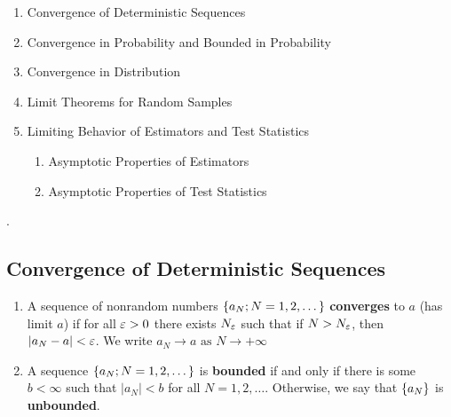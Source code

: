 \documentclass[11pt, oneside, a4paper, article]{article}
\numberwithin{equation}{section}
\begin{document}
\begin{enumerate}[noitemsep, label*=3.\arabic*.]
\item  Convergence of Deterministic Sequences
\item  Convergence in Probability and Bounded in Probability
\item  Convergence in Distribution
\item  Limit Theorems for Random Samples

\item  Limiting Behavior of Estimators and Test Statistics
\begin{enumerate}[noitemsep, leftmargin=1 em, label*=\arabic*.]
\item Asymptotic Properties of Estimators
\item Asymptotic Properties of Test Statistics
\end{enumerate}
\end{enumerate}

.

\subsection{Convergence of Deterministic Sequences}

\begin{defn}
\item
\begin{enumerate}
\item 
A sequence of nonrandom numbers 
$\{a_{N}; N = 1, 2, \dots\}$
\textbf{converges} to $a$ (has limit $a$) if for all $\varepsilon > 0$ there exists $N_{\varepsilon}$ such that if $N > N_{\varepsilon}$, then $|a_{N} - a| < \varepsilon$.
We write
$a_{N} \to a \text{ as } N \to +\infty$

\item
A  sequence 
$\{a_{N}; N = 1, 2, \dots\}$
is \textbf{bounded} if and only if there is some $b < \infty$ such that $|a_{N}| < b$ for all $N = 1, 2, \dots$.
Otherwise, we say that $\{a_{N}\}$ is \textbf{unbounded}.
\end{enumerate}
\end{defn}
\end{document}
